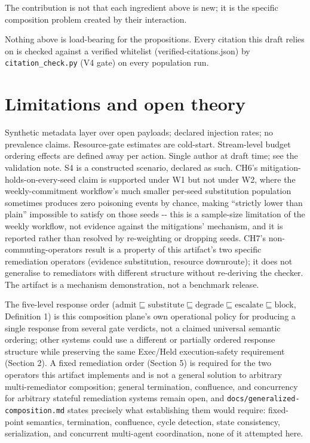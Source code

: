 \documentclass[11pt,a4paper]{article}
\theoremstyle{definition}
\begin{document}
\noindent The contribution is not that each ingredient above is new; it is the specific composition problem created by their interaction.

Nothing above is load-bearing for the propositions. Every citation this draft relies on is checked against a verified whitelist (verified-citations.json) by \texttt{citation\_check.py} (V4 gate) on every population run.

\section{Limitations and open theory}

Synthetic metadata layer over open payloads; declared injection rates; no prevalence claims. Resource-gate estimates are cold-start. Stream-level budget ordering effects are defined away per action. Single author at draft time; see the validation note. S4 is a constructed scenario, declared as such. CH6's mitigation-holds-on-every-seed claim is supported under W1 but not under W2, where the weekly-commitment workflow's much smaller per-seed substitution population sometimes produces zero poisoning events by chance, making ``strictly lower than plain'' impossible to satisfy on those seeds -{}- this is a sample-size limitation of the weekly workflow, not evidence against the mitigations' mechanism, and it is reported rather than resolved by re-weighting or dropping seeds. CH7's non-commuting-operators result is a property of this artifact's two specific remediation operators (evidence substitution, resource downroute); it does not generalise to remediators with different structure without re-deriving the checker. The artifact is a mechanism demonstration, not a benchmark release.

The five-level response order ($\mathrm{admit} \sqsubseteq \mathrm{substitute} \sqsubseteq \mathrm{degrade} \sqsubseteq \mathrm{escalate} \sqsubseteq \mathrm{block}$, Definition 1) is this composition plane's own operational policy for producing a single response from several gate verdicts, not a claimed universal semantic ordering; other systems could use a different or partially ordered response structure while preserving the same Exec/Held execution-safety requirement (Section 2). A fixed remediation order (Section 5) is required for the two operators this artifact implements and is not a general solution to arbitrary multi-remediator composition; general termination, confluence, and concurrency for arbitrary stateful remediation systems remain open, and \texttt{docs/generalized-composition.md} states precisely what establishing them would require: fixed-point semantics, termination, confluence, cycle detection, state consistency, serialization, and concurrent multi-agent coordination, none of it attempted here.
\end{document}

